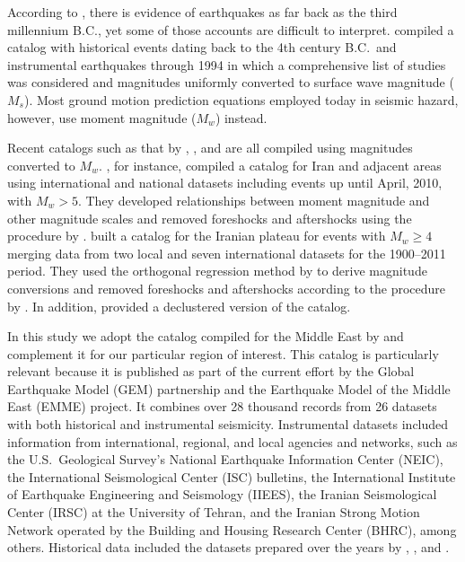 According to \citet{Ambraseys_1982_Book}, there is evidence of earthquakes as far back as the third millennium B.C., yet some of those accounts are difficult to interpret. \citet{Mirzaei1997} compiled a catalog with historical events dating back to the 4th century B.C.~and instrumental earthquakes through 1994 in which a comprehensive list of studies was considered and magnitudes uniformly converted to surface wave magnitude ($M_s$). Most ground motion prediction equations employed today in seismic hazard, however, use moment magnitude ($M_w$) instead. 

Recent catalogs such as that by \citet{Karimiparidari2013}, \citet{Shahvar2013}, and \citet{Zare2014} are all compiled using magnitudes converted to $M_w$. \citet{Karimiparidari2013}, for instance, compiled a catalog for Iran and adjacent areas using international and national datasets including events up until April, 2010, with $M_w > 5$. They developed relationships between moment magnitude and other magnitude scales and removed foreshocks and aftershocks using the procedure by \citet{Gardner1974}. \citet{Shahvar2013} built a catalog for the Iranian plateau for events with $M_w \geq 4$ merging data from two local and seven international datasets for the 1900--2011 period. They used the orthogonal regression method by \citet{Castellaro2006} to derive magnitude conversions and removed foreshocks and aftershocks according to the procedure by \citet{Uhrhammer_1986_EN}. In addition, \citet{Shahvar2013} provided a declustered version of the catalog. 

In this study we adopt the catalog compiled for the Middle East by \citet{Zare2014} and complement it for our particular region of interest. This catalog is particularly relevant because it is published as part of the current effort by the Global Earthquake Model (GEM) partnership and the Earthquake Model of the Middle East (EMME) project. It combines over 28 thousand records from 26 datasets with both historical and instrumental seismicity. Instrumental datasets included information from international, regional, and local agencies and networks, such as the U.S.~Geological Survey's National Earthquake Information Center (NEIC), the International Seismological Center (ISC) bulletins, the International Institute of Earthquake Engineering and Seismology (IIEES), the Iranian Seismological Center (IRSC) at the University of Tehran, and the Iranian Strong Motion Network operated by the Building and Housing Research Center (BHRC), among others. Historical data included the datasets prepared over the years by \citet{Ambraseys_1982_Book}, \citet{Ambraseys_2005_Book}, and \citet{Ambraseys_2009_Book}.

